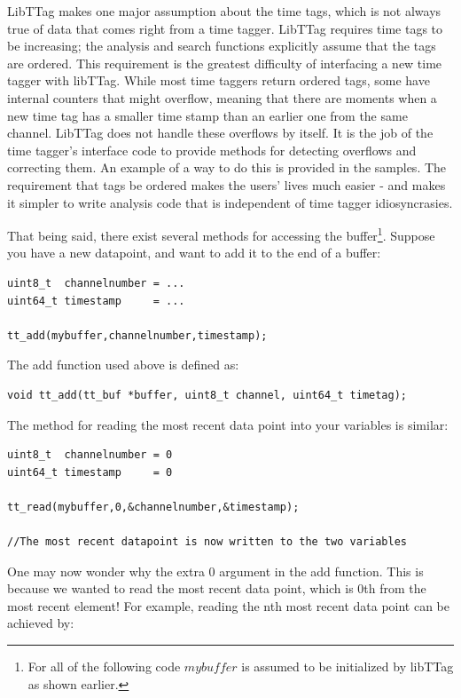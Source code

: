 \documentclass[10pt]{article}
\begin{document}
LibTTag makes one major assumption about the time tags, which is not always true
of data that comes right from a time tagger. LibTTag requires time tags to be increasing;
the analysis and search functions explicitly assume that the tags are ordered. This requirement is the
greatest difficulty of interfacing a new time tagger with libTTag. 
While most time taggers return ordered tags, some have internal
counters that might overflow, meaning that there are moments when a new time tag has a smaller time stamp
than an earlier one from the same channel. LibTTag does not handle these overflows by itself. It is the
job of the time tagger's interface code to provide methods for detecting overflows and correcting them.
An example of a way to do this is provided in the samples. The requirement that tags be ordered makes
the users' lives much easier - and makes it simpler to write analysis code that is independent of time tagger
idiosyncrasies.

That being said, there exist several methods for accessing the buffer\footnote{For all of the following code $mybuffer$ is assumed to be initialized by libTTag as shown earlier.}. Suppose you have a new datapoint, and
want to add it to the end of a buffer:

\begin{verbatim}
uint8_t  channelnumber = ...
uint64_t timestamp     = ...

tt_add(mybuffer,channelnumber,timestamp);
\end{verbatim}

The add function used above is defined as:

\begin{verbatim}
void tt_add(tt_buf *buffer, uint8_t channel, uint64_t timetag);
\end{verbatim}

The method for reading the most recent data point into your variables is similar:

\begin{verbatim}
uint8_t  channelnumber = 0
uint64_t timestamp     = 0

tt_read(mybuffer,0,&channelnumber,&timestamp);

//The most recent datapoint is now written to the two variables
\end{verbatim}

One may now wonder why the extra 0 argument in the add function. This is because we wanted to read the most
recent data point, which is 0th from the most recent element! For example, reading the nth most recent
data point can be achieved by:
\end{document}
